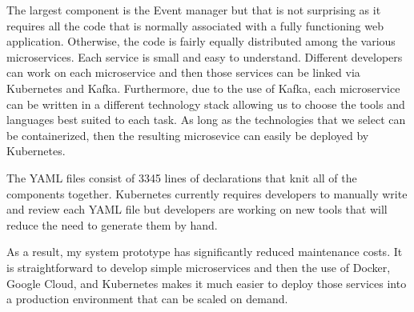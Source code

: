 The largest component is the Event manager but that is not surprising as it requires all the code that is normally associated with a fully functioning web application. Otherwise, the code is fairly equally distributed among the various microservices. Each service is small and easy to understand. Different developers can work on each microservice and then those services can be linked via Kubernetes and Kafka. Furthermore, due to the use of Kafka, each microservice can be written in a different technology stack allowing us to choose the tools and languages best suited to each task. As long as the technologies that we select can be containerized, then the resulting microsevice can easily be deployed by Kubernetes.

The YAML files consist of 3345 lines of declarations that knit all of the components together. Kubernetes currently requires developers to manually write and review each YAML file but developers are working on new tools that will reduce the need to generate them by hand.

As a result, my system prototype has significantly reduced maintenance costs. It is straightforward to develop simple microservices and then the use of Docker, Google Cloud, and Kubernetes makes it much easier to deploy those services into a production environment that can be scaled on demand.

